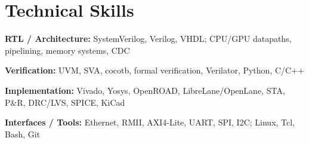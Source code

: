 \documentclass[10pt,letterpaper]{article}
\newcommand{\skill}[2]{\textbf{#1:} #2\par}
\begin{document}
\section{Technical Skills}
\skill{RTL / Architecture}{SystemVerilog, Verilog, VHDL; CPU/GPU datapaths, pipelining, memory systems, CDC}
\skill{Verification}{UVM, SVA, cocotb, formal verification, Verilator, Python, C/C++}
\skill{Implementation}{Vivado, Yosys, OpenROAD, LibreLane/OpenLane, STA, P\&R, DRC/LVS, SPICE, KiCad}
\skill{Interfaces / Tools}{Ethernet, RMII, AXI4-Lite, UART, SPI, I2C; Linux, Tcl, Bash, Git}
\end{document}
